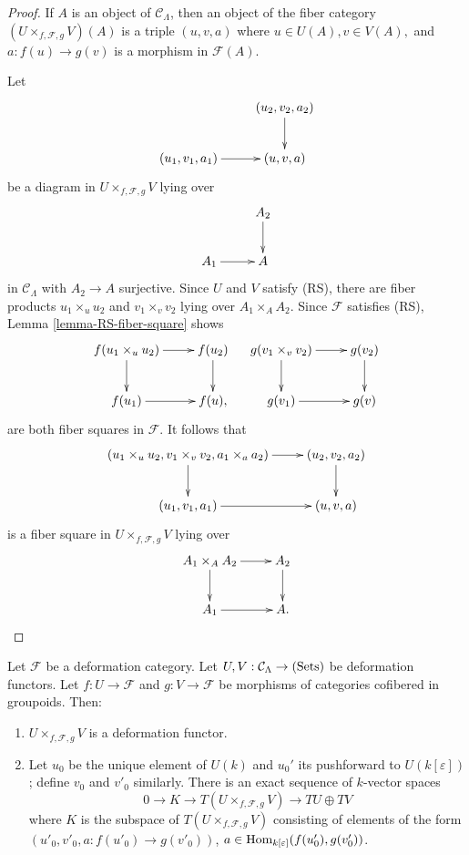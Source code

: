 \begin{proof}
If $A$ is an object of $\mathcal C_{\Lambda}$, then an object of the fiber 
category $(U \times_{f, \mathcal F, g} V)(A)$ is a triple $(u,v,a)$ where $u 
\in U(A), v \in V(A),$ and $a: f(u) \rightarrow g(v)$ is a morphism in 
$\mathcal F(A)$.  

\medskip \noindent 
Let
\[
\xymatrix{
           & (u_2,v_2,a_2) \ar[d] \\
(u_1,v_1,a_1) \ar[r] & (u,v,a)  
}
\]
be a diagram in $U \times_{f, \mathcal F, g} V$ lying over
\[
\xymatrix{
           & A_2 \ar[d] \\
A_1 \ar[r] & A   
}
\]  
in $\mathcal C_{\Lambda}$ with $A_2 \rightarrow A$ surjective.  Since $U$ and 
$V$ satisfy (RS), there are fiber products $u_1 \times_{u} u_2$ and $v_1 
\times_{v} v_2$ lying over $A_1 \times_{A} A_2$.  Since $\mathcal F$ satisfies 
(RS), Lemma \ref{lemma-RS-fiber-square} shows
\[
\xymatrix{
 f(u_1 \times_{u} u_2) \ar[r] \ar[d] & f(u_2) \ar[d] \\
f(u_1) \ar[r] & f(u), 
} \hspace{4 mm} 
\xymatrix{
 g(v_1 \times_{v} v_2) \ar[r] \ar[d] & g(v_2) \ar[d] \\ 
 g(v_1) \ar[r] & g(v)
}
\]
are both fiber squares in $\mathcal F$.  It follows that
\[
\xymatrix{
 (u_1 \times_{u} u_2, v_1 \times_{v} v_2, a_{1} \times_{a} a_2) \ar[d] \ar[r] & 
(u_2,v_2,a_2) \ar[d] \\
(u_1,v_1,a_1) \ar[r] & (u,v,a)  
}
\]
is a fiber square in $U \times_{f, \mathcal F, g} V$ lying over
\[
\xymatrix{
A_1 \times_{A} A_2  \ar[r] \ar[d]         & A_2 \ar[d] \\
A_1 \ar[r] & A   .
}
\] 
\end{proof}

\begin{lemma}
\label{lemma-deformation-functor-fiber-product-morphisms}
Let $\mathcal F$ be a deformation category.  Let $U,V: \mathcal C_{\Lambda} 
\rightarrow \textnormal{(Sets)}$ be deformation functors.  Let $f: U 
\rightarrow \mathcal F$ and $g: V \rightarrow \mathcal F$ be morphisms of 
categories cofibered in groupoids. Then: 
\begin{enumerate}
\item $U \times_{f, \mathcal F, g} V$ is a deformation functor.
\item Let $u_0$ be the unique element of $U(k)$ and $u_0'$ its pushforward to 
$U(k[\varepsilon])$; define $v_0$ and $v'_0$ similarly.  There is an exact 
sequence of $k$-vector spaces
\[ 
0 \rightarrow K \rightarrow T(U \times_{f, \mathcal F, g} V) \rightarrow TU 
\oplus TV 
\]
where $K$ is the subspace of $T(U \times_{f, \mathcal F, g} V)$ consisting of 
elements of the form $(u'_0, v'_0, a: f(u'_0) \rightarrow g(v'_0))$, $a \in 
\textnormal{Hom}_{k[\varepsilon]}(f(u'_0), g(v'_0))$.
\end{enumerate}
\end{lemma}

